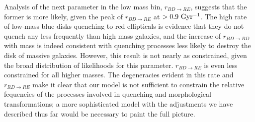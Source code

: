 \documentclass[useAMS,usenatbib]{mn2e}
\begin{document}
 Analysis of the next parameter in the low mass bin, $r_{BD\rightarrow RE}$, suggests that the former is more likely, given the peak of $r_{BD \rightarrow RE}$ at $>0.9 ~\rm Gyr^{-1}$. The high rate of low-mass blue disks quenching to red ellipticals is evidence that they do not quench any less frequently than high mass galaxies, and the increase of $r_{BD \rightarrow RD}$ with mass is indeed consistent with quenching processes less likely to destroy the disk of massive galaxies. However, this result is not nearly as constrained, given the broad distribution of likelihoods for this parameter. $r_{BD \rightarrow RE}$ is even less constrained for all higher masses. The degeneracies evident in this rate and $r_{RD \rightarrow RE}$ make it clear that our model is not sufficient to constrain the relative fequencies of the processes involved in quenching and morphological transformations; a more sophisticated model with the adjustments we have described thus far would be necessary to paint the full picture. 
\end{document}
